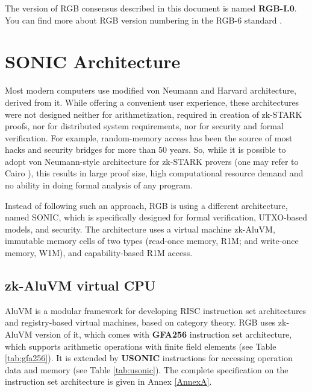 \documentclass[9pt,oneside]{amsart}
\begin{document}
\begin{multicols}{2}
The version of RGB consensus described in this document is named \textbf{RGB-I.0}.
You can find more about RGB version numbering in the RGB-6 standard \cite{RGB6}.

\section{SONIC Architecture}

Most modern computers use modified von Neumann and Harvard architecture, derived from it.
While offering a convenient user experience, these architectures were not designed neither for
arithmetization, required in creation of zk-STARK proofs, nor for distributed system requirements,
nor for security and formal verification. For example, random-memory access has been the source
of most hacks and security bridges for more than 50 years.
So, while it is possible to adopt von Neumann-style architecture for zk-STARK provers
(one may refer to Cairo \cite{Cairo}), this results in large proof size, high computational resource demand
and no ability in doing formal analysis of any program.

Instead of following such an approach, RGB is using a different architecture, named SONIC,
which is specifically designed for formal verification, UTXO-based models, and security.
The architecture uses a virtual machine zk-AluVM, immutable memory cells of two types
(read-once memory, R1M; and write-once memory, W1M), and capability-based R1M access.

\subsection{zk-AluVM virtual CPU}\label{AluVM}

AluVM \cite{AluVM} is a modular framework for developing RISC instruction set architectures and registry-based
virtual machines, based on category theory. RGB uses zk-AluVM version of it, 
which comes with \textbf{GFA256} instruction set architecture, which supports arithmetic operations with
finite field elements (see Table \ref{tab:gfa256}). It is extended by \textbf{USONIC} instructions
for accessing operation data and memory (see Table \ref{tab:usonic}).
The complete specification on the instruction set architecture is given in Annex \ref{AnnexA}.

\end{multicols}
\end{document}
